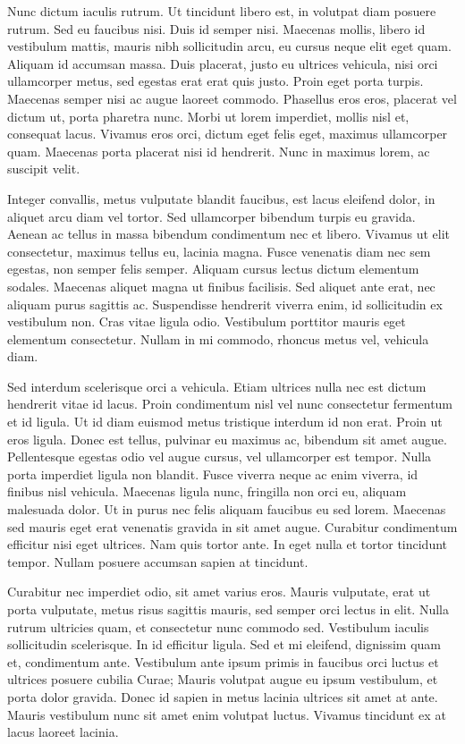 Nunc dictum iaculis rutrum. Ut tincidunt libero est, in volutpat diam
posuere rutrum. Sed eu faucibus nisi. Duis id semper nisi. Maecenas
mollis, libero id vestibulum mattis, mauris nibh sollicitudin arcu, eu
cursus neque elit eget quam. Aliquam id accumsan massa. Duis placerat,
justo eu ultrices vehicula, nisi orci ullamcorper metus, sed egestas
erat erat quis justo. Proin eget porta turpis. Maecenas semper nisi ac
augue laoreet commodo. Phasellus eros eros, placerat vel dictum ut,
porta pharetra nunc. Morbi ut lorem imperdiet, mollis nisl et,
consequat lacus. Vivamus eros orci, dictum eget felis eget, maximus
ullamcorper quam. Maecenas porta placerat nisi id hendrerit. Nunc in
maximus lorem, ac suscipit velit. 

Integer convallis, metus vulputate blandit faucibus, est lacus
eleifend dolor, in aliquet arcu diam vel tortor. Sed ullamcorper
bibendum turpis eu gravida. Aenean ac tellus in massa bibendum
condimentum nec et libero. Vivamus ut elit consectetur, maximus tellus
eu, lacinia magna. Fusce venenatis diam nec sem egestas, non semper
felis semper. Aliquam cursus lectus dictum elementum sodales. Maecenas
aliquet magna ut finibus facilisis. Sed aliquet ante erat, nec aliquam
purus sagittis ac. Suspendisse hendrerit viverra enim, id sollicitudin
ex vestibulum non. Cras vitae ligula odio. Vestibulum porttitor mauris
eget elementum consectetur. Nullam in mi commodo, rhoncus metus vel,
vehicula diam. 

Sed interdum scelerisque orci a vehicula. Etiam ultrices nulla nec est
dictum hendrerit vitae id lacus. Proin condimentum nisl vel nunc
consectetur fermentum et id ligula. Ut id diam euismod metus tristique
interdum id non erat. Proin ut eros ligula. Donec est tellus, pulvinar
eu maximus ac, bibendum sit amet augue. Pellentesque egestas odio vel
augue cursus, vel ullamcorper est tempor. Nulla porta imperdiet ligula
non blandit. Fusce viverra neque ac enim viverra, id finibus nisl
vehicula. Maecenas ligula nunc, fringilla non orci eu, aliquam
malesuada dolor. Ut in purus nec felis aliquam faucibus eu sed lorem.
Maecenas sed mauris eget erat venenatis gravida in sit amet augue.
Curabitur condimentum efficitur nisi eget ultrices. Nam quis tortor
ante. In eget nulla et tortor tincidunt tempor. Nullam posuere
accumsan sapien at tincidunt. 

Curabitur nec imperdiet odio, sit amet varius eros. Mauris vulputate,
erat ut porta vulputate, metus risus sagittis mauris, sed semper orci
lectus in elit. Nulla rutrum ultricies quam, et consectetur nunc
commodo sed. Vestibulum iaculis sollicitudin scelerisque. In id
efficitur ligula. Sed et mi eleifend, dignissim quam et, condimentum
ante. Vestibulum ante ipsum primis in faucibus orci luctus et ultrices
posuere cubilia Curae; Mauris volutpat augue eu ipsum vestibulum, et
porta dolor gravida. Donec id sapien in metus lacinia ultrices sit
amet at ante. Mauris vestibulum nunc sit amet enim volutpat luctus.
Vivamus tincidunt ex at lacus laoreet lacinia. 

